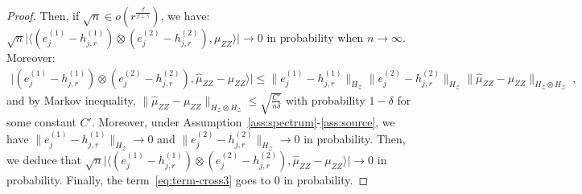 \begin{proof}
Then, if $\sqrt{n}\in o(r^{\frac{\beta}{\beta+\gamma}})$, we have:
$ \sqrt{n}\lvert\langle\left(e^{(1)}_{j}-h^{(1)}_{j,r}\right)\otimes\left(e^{(2)}_{j}-h^{(2)}_{j,r}\right),\mu_{ZZ}\rangle\rvert\to 0$ in probability when $n\to\infty$. Moreover:
\begin{align*}
    \lvert \left(e^{(1)}_{j}-h^{(1)}_{j,r}\right)\otimes\left(e^{(2)}_{j}-h^{(2)}_{j,r}\right),\hat{\mu}_{ZZ}-\mu_{ZZ}\rangle\rvert\leq \lVert e^{(1)}_{j}-h^{(1)}_{j,r}\rVert_{ H_\mathcal{Z}} \lVert e^{(2)}_{j}-h^{(2)}_{j,r}\rVert_{ H_\mathcal{Z}}\lVert\hat{\mu}_{ZZ}-\mu_{ZZ}\rVert_{ H_\mathcal{Z}\otimes H_\mathcal{Z}}\; ,
\end{align*}
and by Markov inequality, $\lVert\hat{\mu}_{ZZ}-\mu_{ZZ}\rVert_{H_\mathcal{Z}\otimes H_\mathcal{Z}} \leq \sqrt{\frac{C'}{n\delta}}$ with probability $1-\delta$ for some constant $C'$. Moreover, under Assumption~\ref{ass:spectrum}-\ref{ass:source}, we have $\lVert e^{(1)}_{j}-h^{(1)}_{j,r}\rVert_{ H_\mathcal{Z}}\to 0$ and $\lVert e^{(2)}_{j}-h^{(2)}_{j,r}\rVert_{ H_\mathcal{Z}}\to 0$ in probability. Then, we deduce that $\sqrt{n}\lvert \langle\left(e^{(1)}_{j}-h^{(1)}_{j,r}\right)\otimes\left(e^{(2)}_{j}-h^{(2)}_{j,r}\right),\hat{\mu}_{ZZ}-\mu_{ZZ}\rangle\rvert\to 0$ in probability. Finally, the term~\eqref{eq:term-cross3} goes to $0$ in probability. 




\end{proof}
